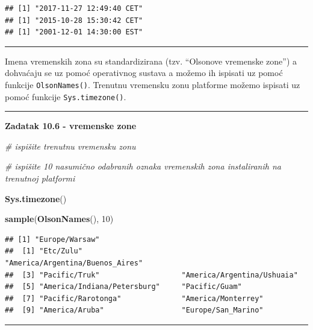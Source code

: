 \documentclass[]{book}
\newenvironment{Shaded}{\begin{snugshade}}{\end{snugshade}}
\newcommand{\KeywordTok}[1]{\textcolor[rgb]{0.13,0.29,0.53}{\textbf{#1}}}
\newcommand{\DecValTok}[1]{\textcolor[rgb]{0.00,0.00,0.81}{#1}}
\newcommand{\CommentTok}[1]{\textcolor[rgb]{0.56,0.35,0.01}{\textit{#1}}}
\newcommand{\NormalTok}[1]{#1}
\theoremstyle{definition}
\theoremstyle{definition}
\theoremstyle{definition}
\theoremstyle{remark}
\begin{document}
\begin{verbatim}
## [1] "2017-11-27 12:49:40 CET"
## [1] "2015-10-28 15:30:42 CET"
## [1] "2001-12-01 14:30:00 EST"
\end{verbatim}

\begin{center}\rule{0.5\linewidth}{\linethickness}\end{center}

Imena vremenskih zona su standardizirana (tzv. ``Olsonove vremenske
zone'') a dohvaćaju se uz pomoć operativnog sustava a možemo ih ispisati
uz pomoć funkcije \texttt{OlsonNames()}. Trenutnu vremensku zonu
platforme možemo ispisati uz pomoć funkcije \texttt{Sys.timezone()}.

\begin{center}\rule{0.5\linewidth}{\linethickness}\end{center}

\textbf{Zadatak 10.6 - vremenske zone}

\begin{Shaded}
\begin{Highlighting}[]
\CommentTok{# ispišite trenutnu vremensku zonu}

\CommentTok{# ispišite 10 nasumično odabranih oznaka vremenskih zona instaliranih na trenutnoj platformi}
\end{Highlighting}
\end{Shaded}

\begin{Shaded}
\begin{Highlighting}[]
\KeywordTok{Sys.timezone}\NormalTok{()}

\KeywordTok{sample}\NormalTok{(}\KeywordTok{OlsonNames}\NormalTok{(), }\DecValTok{10}\NormalTok{)}
\end{Highlighting}
\end{Shaded}

\begin{verbatim}
## [1] "Europe/Warsaw"
##  [1] "Etc/Zulu"                       "America/Argentina/Buenos_Aires"
##  [3] "Pacific/Truk"                   "America/Argentina/Ushuaia"     
##  [5] "America/Indiana/Petersburg"     "Pacific/Guam"                  
##  [7] "Pacific/Rarotonga"              "America/Monterrey"             
##  [9] "America/Aruba"                  "Europe/San_Marino"
\end{verbatim}

\begin{center}\rule{0.5\linewidth}{\linethickness}\end{center}
\end{document}
